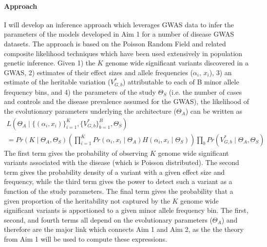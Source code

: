 \documentclass[11pt]{article}
\newcommand{\jb}[1]{{\color{blue} (#1)} }
\begin{document}


\paragraph{Approach}
I will develop an inference approach which leverages GWAS data to infer the parameters of the models developed in Aim 1 for a number of disease GWAS datasets. The approach is based on the Poisson Random Field and related composite likelihood techniques which have been used extensively in population genetic inference. Given 1) the $K$ genome wide significant variants discovered in a GWAS, 2) estimates of their effect sizes and allele frequencies ($\alpha_i$, $x_i$), 3) an estimate of the heritable variation ($V^*_{G,b}$) attributable to each of B minor allele frequency bins, and 4) the parameters of the study $\Theta_S$ (i.e. the number of cases and controls and the disease prevalence assumed for the GWAS), the likelihood of the evolutionary parameters underlying the architecture ($\Theta_A$) can be written as
\begin{multline*}
  L\left(\Theta_A \mid \{\left(\alpha_i, x_i\right)\}_{i=1}^K , \{V^*_{G,b}\}_{b=1}^B, \Theta_S\right) \\
               = Pr\left(K \mid \Theta_A , \Theta_S \right) \left( \prod_{i=1}^K Pr\left(\alpha_i , x_i \mid \Theta_A \right) H\left(\alpha_i , x_i \mid \Theta_S\right) \right) \prod_b Pr\left(V^*_{G,b} \mid \Theta_A, \Theta_S \right)
\end{multline*}
The first term gives the probability of observing $K$ genome wide significant variants associated with the disease (which is Poisson distributed). The second term gives the probability density of a variant with a given effect size and frequency, while the third term gives the power to detect such a variant as a function of the study parameters. The final term gives the probability that a given proportion of the heritability not captured by the $K$ genome wide significant variants is apportioned to a given minor allele frequency bin. The first, second, and fourth terms all depend on the evolutionary parameters ($\Theta_A$) and therefore are the major link which connects Aim 1 and Aim 2, as the the theory from Aim 1 will be used to compute these expressions.
\end{document}
